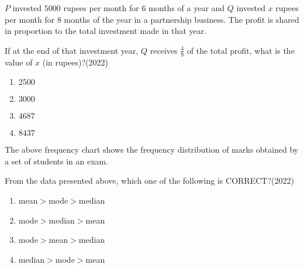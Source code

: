 \item $P$ invested $5000$ rupees per month for $6$ months of a year and $Q$ invested $x$ rupees per month for $8$ months of the year in a partnership business. The profit is shared in proportion to the total investment made in that year.

If at the end of that investment year, $Q$ receives $\frac{4}{9}$ of the total profit, what is the value of $x$ (in rupees)?\hfill(2022)
\begin{multicols}{2}
\begin{enumerate}
\item $2500$
\item $3000$
\item $4687$
\item $8437$
\end{enumerate}
\end{multicols}


\item {}

The above frequency chart shows the frequency distribution of marks obtained by a set of students in an exam.

From the data presented above, which one of the following is CORRECT?\hfill(2022)
\begin{multicols}{2}
\begin{enumerate}
\item mean$>$mode$>$median
\item mode$>$median$>$mean
\item mode$>$mean$>$median
\item median$>$mode$>$mean
\end{enumerate}
\end{multicols}


